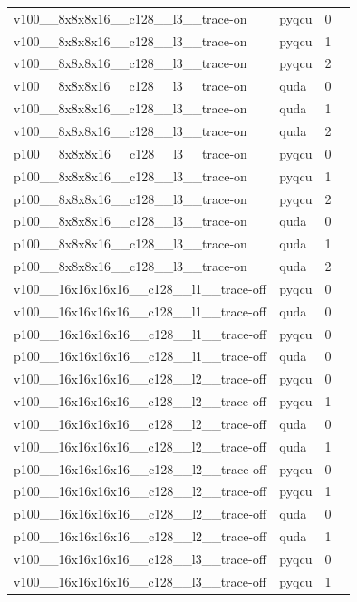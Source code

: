 \begin{table}[htbp]
\begin{tabular}{@{}llrr@{}}
v100\_\_8x8x8x16\_\_c128\_\_l3\_\_trace-on & pyqcu & 0 &  \\
v100\_\_8x8x8x16\_\_c128\_\_l3\_\_trace-on & pyqcu & 1 &  \\
v100\_\_8x8x8x16\_\_c128\_\_l3\_\_trace-on & pyqcu & 2 &  \\
v100\_\_8x8x8x16\_\_c128\_\_l3\_\_trace-on & quda & 0 &  \\
v100\_\_8x8x8x16\_\_c128\_\_l3\_\_trace-on & quda & 1 &  \\
v100\_\_8x8x8x16\_\_c128\_\_l3\_\_trace-on & quda & 2 &  \\
p100\_\_8x8x8x16\_\_c128\_\_l3\_\_trace-on & pyqcu & 0 &  \\
p100\_\_8x8x8x16\_\_c128\_\_l3\_\_trace-on & pyqcu & 1 &  \\
p100\_\_8x8x8x16\_\_c128\_\_l3\_\_trace-on & pyqcu & 2 &  \\
p100\_\_8x8x8x16\_\_c128\_\_l3\_\_trace-on & quda & 0 &  \\
p100\_\_8x8x8x16\_\_c128\_\_l3\_\_trace-on & quda & 1 &  \\
p100\_\_8x8x8x16\_\_c128\_\_l3\_\_trace-on & quda & 2 &  \\
v100\_\_16x16x16x16\_\_c128\_\_l1\_\_trace-off & pyqcu & 0 &  \\
v100\_\_16x16x16x16\_\_c128\_\_l1\_\_trace-off & quda & 0 &  \\
p100\_\_16x16x16x16\_\_c128\_\_l1\_\_trace-off & pyqcu & 0 &  \\
p100\_\_16x16x16x16\_\_c128\_\_l1\_\_trace-off & quda & 0 &  \\
v100\_\_16x16x16x16\_\_c128\_\_l2\_\_trace-off & pyqcu & 0 &  \\
v100\_\_16x16x16x16\_\_c128\_\_l2\_\_trace-off & pyqcu & 1 &  \\
v100\_\_16x16x16x16\_\_c128\_\_l2\_\_trace-off & quda & 0 &  \\
v100\_\_16x16x16x16\_\_c128\_\_l2\_\_trace-off & quda & 1 &  \\
p100\_\_16x16x16x16\_\_c128\_\_l2\_\_trace-off & pyqcu & 0 &  \\
p100\_\_16x16x16x16\_\_c128\_\_l2\_\_trace-off & pyqcu & 1 &  \\
p100\_\_16x16x16x16\_\_c128\_\_l2\_\_trace-off & quda & 0 &  \\
p100\_\_16x16x16x16\_\_c128\_\_l2\_\_trace-off & quda & 1 &  \\
v100\_\_16x16x16x16\_\_c128\_\_l3\_\_trace-off & pyqcu & 0 &  \\
v100\_\_16x16x16x16\_\_c128\_\_l3\_\_trace-off & pyqcu & 1 &  \\

\end{tabular}
\end{table}
